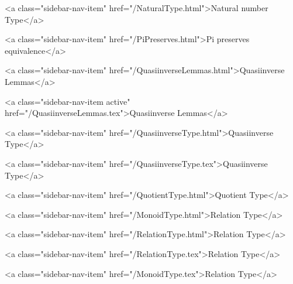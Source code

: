       
    
      
        
          <a class="sidebar-nav-item" href="/NaturalType.html">Natural number Type</a>
        
      
    
      
        
          <a class="sidebar-nav-item" href="/PiPreserves.html">Pi preserves equivalence</a>
        
      
    
      
        
          <a class="sidebar-nav-item" href="/QuasiinverseLemmas.html">Quasiinverse Lemmas</a>
        
      
    
      
        
          <a class="sidebar-nav-item active" href="/QuasiinverseLemmas.tex">Quasiinverse Lemmas</a>
        
      
    
      
        
          <a class="sidebar-nav-item" href="/QuasiinverseType.html">Quasiinverse Type</a>
        
      
    
      
        
          <a class="sidebar-nav-item" href="/QuasiinverseType.tex">Quasiinverse Type</a>
        
      
    
      
        
          <a class="sidebar-nav-item" href="/QuotientType.html">Quotient Type</a>
        
      
    
      
        
          <a class="sidebar-nav-item" href="/MonoidType.html">Relation Type</a>
        
      
    
      
        
          <a class="sidebar-nav-item" href="/RelationType.html">Relation Type</a>
        
      
    
      
        
          <a class="sidebar-nav-item" href="/RelationType.tex">Relation Type</a>
        
      
    
      
        
          <a class="sidebar-nav-item" href="/MonoidType.tex">Relation Type</a>
        
